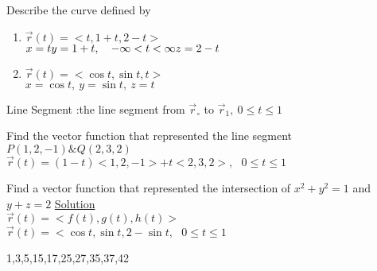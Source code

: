 \begin{example}
Describe the curve defined by 
\begin{enumerate}
    \item $\overrightarrow{r}(t)=<t,1+t,2-t>$\\
    $x=t\\ y=1+t,~~~-\infty<t<\infty\\ z=2-t$\\
    \item $\overrightarrow{r}(t)=<\cos{t},\sin{t},t>$\\
    $x=\cos{t},~y=\sin{t},~z=t$
\end{enumerate}
\end{example}

\begin{definition}
Line Segment :the line segment from $\overrightarrow{r}_\circ$ to $\overrightarrow{r}_1,~0\leq t\leq 1$
\end{definition}
\noindent{\color{smalt(darkpowderblue)}\rule{\linewidth}{.2mm}}
\begin{example}
Find the vector function that represented the line segment $P(1,2,-1)\&Q(2,3,2)$\\
$\overrightarrow{r}(t)=(1-t)<1,2,-1>+t<2,3,2>,~~~0\leq t \leq 1$\\
\end{example}
\noindent{\color{smalt(darkpowderblue)}\rule{\linewidth}{.2mm}}
\begin{example}
Find a vector function that represented the intersection of $x^2+y^2=1$ and $y+z=2$
\underline{\textbf{\large}\color{smalt(darkpowderblue)}Solution}\\
$\overrightarrow{r}(t)=<f(t),g(t),h(t)>$\\
$\overrightarrow{r}(t)=<\cos{t},\sin{t},2-\sin{t},~~~0\leq t\leq 1$\\
\end{example}
\noindent{\color{smalt(darkpowderblue)}\rule{\linewidth}{.2mm}}
\begin{problem}
1,3,5,15,17,25,27,35,37,42
\end{problem}
